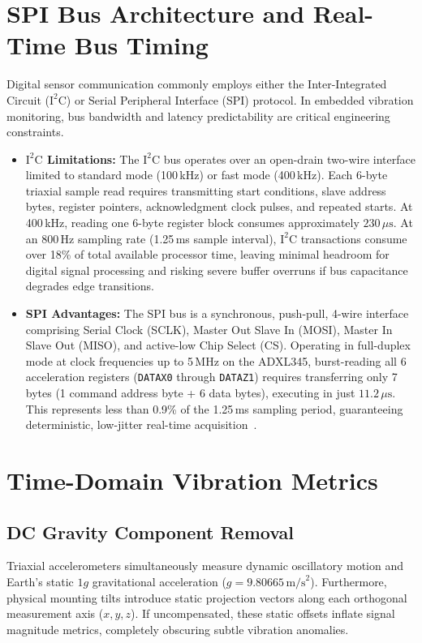 \section{SPI Bus Architecture and Real-Time Bus Timing}
Digital sensor communication commonly employs either the Inter-Integrated Circuit ($\mathrm{I^2C}$) or Serial Peripheral Interface (SPI) protocol. In embedded vibration monitoring, bus bandwidth and latency predictability are critical engineering constraints.
\begin{itemize}
    \item \textbf{$\mathrm{I^2C}$ Limitations:} The $\mathrm{I^2C}$ bus operates over an open-drain two-wire interface limited to standard mode (100\,kHz) or fast mode (400\,kHz). Each 6-byte triaxial sample read requires transmitting start conditions, slave address bytes, register pointers, acknowledgment clock pulses, and repeated starts. At 400\,kHz, reading one 6-byte register block consumes approximately $230\,\mu\text{s}$. At an 800\,Hz sampling rate (1.25\,ms sample interval), $\mathrm{I^2C}$ transactions consume over 18\% of total available processor time, leaving minimal headroom for digital signal processing and risking severe buffer overruns if bus capacitance degrades edge transitions.
    \item \textbf{SPI Advantages:} The SPI bus is a synchronous, push-pull, 4-wire interface comprising Serial Clock (SCLK), Master Out Slave In (MOSI), Master In Slave Out (MISO), and active-low Chip Select (CS). Operating in full-duplex mode at clock frequencies up to 5\,MHz on the ADXL345, burst-reading all 6 acceleration registers (\texttt{DATAX0} through \texttt{DATAZ1}) requires transferring only 7 bytes (1 command address byte + 6 data bytes), executing in just $11.2\,\mu\text{s}$. This represents less than 0.9\% of the 1.25\,ms sampling period, guaranteeing deterministic, low-jitter real-time acquisition~\cite{vibeguard_primer2026, esp32_trm}.
\end{itemize}

\section{Time-Domain Vibration Metrics}
\subsection{DC Gravity Component Removal}
Triaxial accelerometers simultaneously measure dynamic oscillatory motion and Earth's static $1g$ gravitational acceleration ($g = 9.80665\,\text{m/s}^2$). Furthermore, physical mounting tilts introduce static projection vectors along each orthogonal measurement axis ($x, y, z$). If uncompensated, these static offsets inflate signal magnitude metrics, completely obscuring subtle vibration anomalies.

